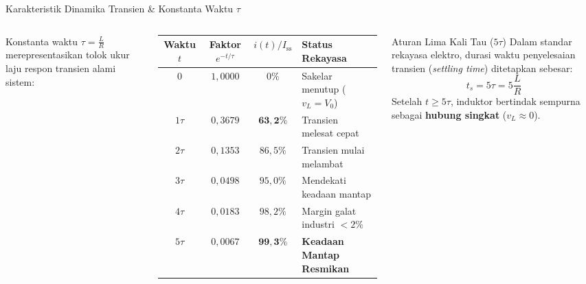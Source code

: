 \documentclass[aspectratio=169,10pt]{beamer}
\begin{document}
\begin{frame}{Karakteristik Dinamika Transien \& Konstanta Waktu $\tau$}
  \begin{columns}
    Konstanta waktu $\tau = \frac{L}{R}$ merepresentasikan tolok ukur laju respon transien alami sistem:
    \vspace{0.15cm}
    \begin{table}[h]
      \centering
      \scriptsize
      \begin{tabular}{cccl}
        \toprule
        \textbf{Waktu $t$} & \textbf{Faktor $e^{-t/\tau}$} & \textbf{$i(t) / I_{\text{ss}}$} & \textbf{Status Rekayasa} \\ \midrule
        $0$ & $1{,}0000$ & $0\%$ & Sakelar menutup ($v_L = V_0$) \\
        $1\tau$ & $0{,}3679$ & $\mathbf{63{,}2\%}$ & Transien melesat cepat \\
        $2\tau$ & $0{,}1353$ & $86{,}5\%$ & Transien mulai melambat \\
        $3\tau$ & $0{,}0498$ & $95{,}0\%$ & Mendekati keadaan mantap \\
        $4\tau$ & $0{,}0183$ & $98{,}2\%$ & Margin galat industri $<2\%$ \\
        $5\tau$ & $0{,}0067$ & $\mathbf{99{,}3\%}$ & \textbf{Keadaan Mantap Resmikan} \\ \bottomrule
      \end{tabular}
    \end{table}

    \begin{alertblock}{Aturan Lima Kali Tau ($5\tau$)}
      Dalam standar rekayasa elektro, durasi waktu penyelesaian transien (\textit{settling time}) ditetapkan sebesar:
      \begin{equation*}
        t_s = 5\tau = 5 \frac{L}{R}
      \end{equation*}
      Setelah $t \ge 5\tau$, induktor bertindak sempurna sebagai \textbf{hubung singkat} ($v_L \approx 0$).
    \end{alertblock}
  \end{columns}
\end{frame}
\end{document}
